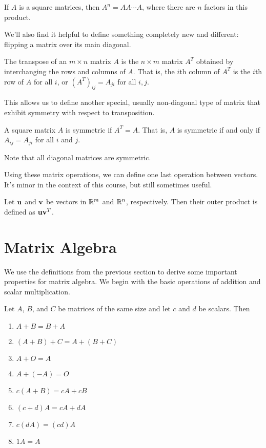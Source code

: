 \documentclass[../m073main.tex]{subfiles}
\begin{document}
\begin{definition}
	If $A$ is a square matrices, then $A^n = AA\cdots A$, where there are $n$ factors in this product.
\end{definition}

We'll also find it helpful to define something completely new and different: flipping a matrix over its main diagonal.

\begin{definition}
	The transpose of an $m\times n$ matrix $A$ is the $n\times m$ matrix $A^T$ obtained by interchanging the rows and columns of $A$.
	That is, the $i$th column of $A^T$ is the $i$th row of $A$ for all $i$, or $(A^T)_{ij} = A_{ji}$ for all $i, j$.
\end{definition}

This allows us to define another special, usually non-diagonal type of matrix that exhibit symmetry with respect to transposition.

\begin{definition}
	A square matrix $A$ is symmetric if $A^T = A$.
	That is, $A$ is symmetric if and only if $A_{ij} = A_{ji}$ for all $i$ and $j$.
\end{definition}

Note that all diagonal matrices are symmetric.

Using these matrix operations, we can define one last operation between vectors.
It's minor in the context of this course, but still sometimes useful.

\begin{definition}
	Let $\mathbf{u}$ and $\mathbf{v}$ be vectors in $\mathbb{R}^m$ and $\mathbb{R}^n$, respectively.
	Then their outer product is defined as $\mathbf{u}\mathbf{v}^T$.
\end{definition}

\section{Matrix Algebra}
We use the definitions from the previous section to derive some important properties for matrix algebra.
We begin with the basic operations of addition and scalar multiplication.

\begin{theorem}
	Let $A$, $B$, and $C$ be matrices of the same size and let $c$ and $d$ be scalars.
	Then
	\begin{enumerate}[label=(\alph*)]
		\item $A + B = B + A$
		\item $(A + B) + C = A + (B + C)$
		\item $A + O = A$
		\item $A + (-A) = O$
		\item $c(A + B) = cA + cB$
		\item $(c+d)A = cA + dA$
		\item $c(dA) = (cd)A$
		\item $1A = A$
	\end{enumerate}
\end{theorem}
\end{document}
